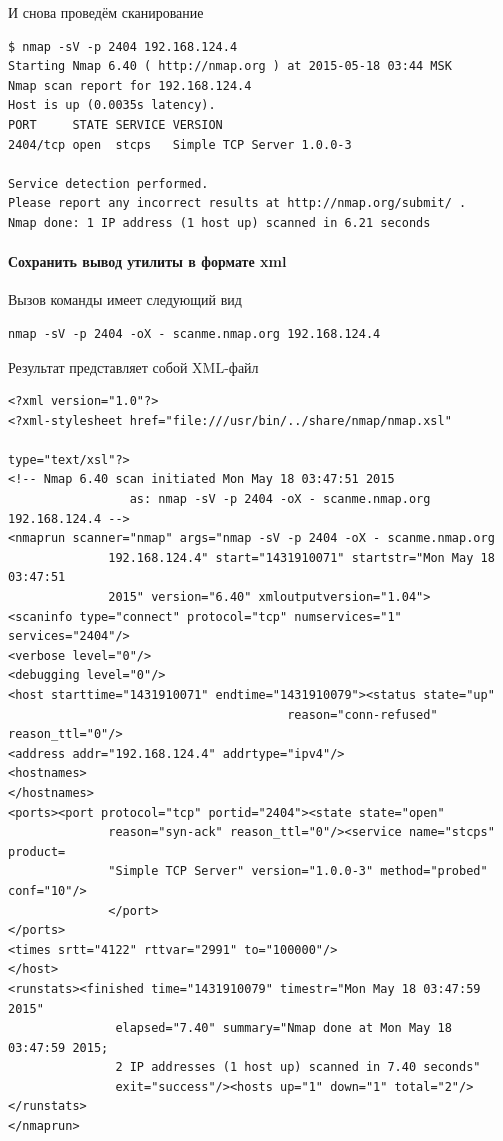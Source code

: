 И снова проведём сканирование

\begin{Verbatim}[frame=single]
$ nmap -sV -p 2404 192.168.124.4
Starting Nmap 6.40 ( http://nmap.org ) at 2015-05-18 03:44 MSK
Nmap scan report for 192.168.124.4
Host is up (0.0035s latency).
PORT     STATE SERVICE VERSION
2404/tcp open  stcps   Simple TCP Server 1.0.0-3

Service detection performed. 
Please report any incorrect results at http://nmap.org/submit/ .
Nmap done: 1 IP address (1 host up) scanned in 6.21 seconds
\end{Verbatim}

\paragraph{Сохранить вывод утилиты в формате xml}

Вызов команды имеет следующий вид
\begin{Verbatim}[frame=single]
nmap -sV -p 2404 -oX - scanme.nmap.org 192.168.124.4
\end{Verbatim}

Результат представляет собой XML-файл
\begin{Verbatim}[frame=single]
<?xml version="1.0"?>
<?xml-stylesheet href="file:///usr/bin/../share/nmap/nmap.xsl"
                                                            type="text/xsl"?>
<!-- Nmap 6.40 scan initiated Mon May 18 03:47:51 2015
                 as: nmap -sV -p 2404 -oX - scanme.nmap.org 192.168.124.4 -->
<nmaprun scanner="nmap" args="nmap -sV -p 2404 -oX - scanme.nmap.org
              192.168.124.4" start="1431910071" startstr="Mon May 18 03:47:51
              2015" version="6.40" xmloutputversion="1.04">
<scaninfo type="connect" protocol="tcp" numservices="1" services="2404"/>
<verbose level="0"/>
<debugging level="0"/>
<host starttime="1431910071" endtime="1431910079"><status state="up"
                                       reason="conn-refused" reason_ttl="0"/>
<address addr="192.168.124.4" addrtype="ipv4"/>
<hostnames>
</hostnames>
<ports><port protocol="tcp" portid="2404"><state state="open"
              reason="syn-ack" reason_ttl="0"/><service name="stcps" product=
              "Simple TCP Server" version="1.0.0-3" method="probed" conf="10"/>
              </port>
</ports>
<times srtt="4122" rttvar="2991" to="100000"/>
</host>
<runstats><finished time="1431910079" timestr="Mon May 18 03:47:59 2015"
               elapsed="7.40" summary="Nmap done at Mon May 18 03:47:59 2015;
               2 IP addresses (1 host up) scanned in 7.40 seconds"
               exit="success"/><hosts up="1" down="1" total="2"/>
</runstats>
</nmaprun>
\end{Verbatim}

